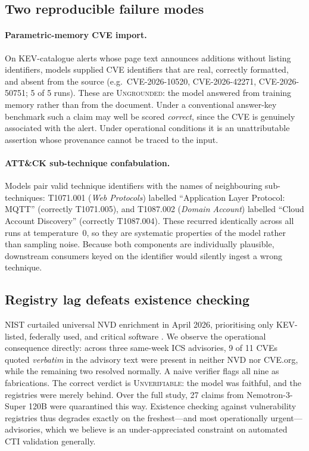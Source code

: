 \documentclass[10pt,twocolumn]{article}
\begin{document}
\subsection{Two reproducible failure modes}

\paragraph{Parametric-memory CVE import.}
On KEV-catalogue alerts whose page text announces additions without listing
identifiers, models supplied CVE identifiers that are real, correctly
formatted, and absent from the source (e.g.\ CVE-2026-10520, CVE-2026-42271,
CVE-2026-50751; 5 of 5 runs). These are \textsc{Ungrounded}: the model answered
from training memory rather than from the document. Under a conventional
answer-key benchmark such a claim may well be scored \emph{correct}, since the
CVE is genuinely associated with the alert. Under operational conditions it is
an unattributable assertion whose provenance cannot be traced to the input.

\paragraph{ATT\&CK sub-technique confabulation.}
Models pair valid technique identifiers with the names of neighbouring
sub-techniques: T1071.001 (\emph{Web Protocols}) labelled ``Application Layer
Protocol: MQTT'' (correctly T1071.005), and T1087.002 (\emph{Domain Account})
labelled ``Cloud Account Discovery'' (correctly T1087.004). These recurred
identically across all runs at temperature~0, so they are systematic properties
of the model rather than sampling noise. Because both components are
individually plausible, downstream consumers keyed on the identifier would
silently ingest a wrong technique.

\subsection{Registry lag defeats existence checking}
NIST curtailed universal NVD enrichment in April 2026, prioritising only
KEV-listed, federally used, and critical software \cite{nist2026nvd,
helpnet2026nvd}. We observe the operational consequence directly: across three
same-week ICS advisories, 9 of 11 CVEs quoted \emph{verbatim} in the advisory
text were present in neither NVD nor CVE.org, while the remaining two resolved
normally. A naive verifier flags all nine as fabrications. The correct verdict
is \textsc{Unverifiable}: the model was faithful, and the registries were
merely behind. Over the full study, 27 claims from Nemotron-3-Super 120B were
quarantined this way. Existence checking against vulnerability registries thus
degrades exactly on the freshest---and most operationally urgent---advisories,
which we believe is an under-appreciated constraint on automated CTI validation
generally.
\end{document}
